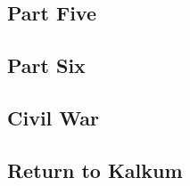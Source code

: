 \subsection{Part Five}


\subsection{Part Six}


\subsection{Civil War}


\subsection{Return to Kalkum}

